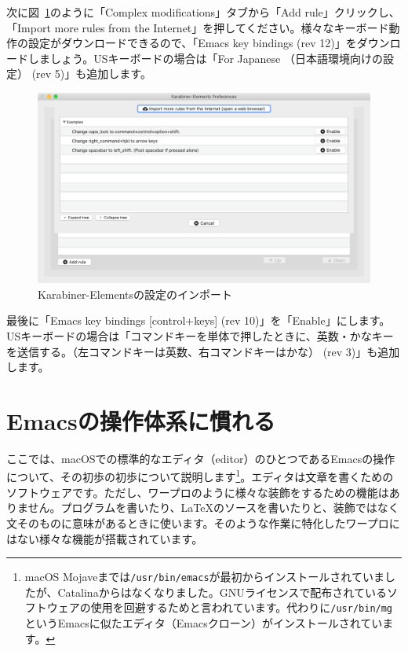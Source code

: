 次に図~\ref{fig:Karabiner_import}のように「Complex modifications」タブから「Add rule」クリックし、「Import more rules from the Internet」を押してください。様々なキーボード動作の設定がダウンロードできるので、「Emacs key bindings (rev 12)」をダウンロードしましょう。USキーボードの場合は「For Japanese （日本語環境向けの設定） (rev 5)」も追加します。

\begin{figure}
  \centering
  \includegraphics[scale=0.35]{fig/Karabiner_import.png}
  \caption{Karabiner-Elementsの設定のインポート}
  \label{fig:Karabiner_import}
\end{figure}

最後に「Emacs key bindings [control+keys] (rev 10)」を「Enable」にします。USキーボードの場合は「コマンドキーを単体で押したときに、英数・かなキーを送信する。（左コマンドキーは英数、右コマンドキーはかな） (rev 3)」も追加します。

\section{Emacsの操作体系に慣れる}
\label{sec:Emacs}

ここでは、macOSでの標準的なエディタ（editor）のひとつであるEmacsの操作について、その初歩の初歩について説明します\footnote{macOS Mojaveまでは\texttt{/usr/bin/emacs}が最初からインストールされていましたが、Catalinaからはなくなりました。GNUライセンスで配布されているソフトウェアの使用を回避するためと言われています。代わりに\texttt{/usr/bin/mg}というEmacsに似たエディタ（Emacsクローン）がインストールされています。}。エディタは文章を書くためのソフトウェアです。ただし、ワープロのように様々な装飾をするための機能はありません。プログラムを書いたり、\LaTeX{}のソースを書いたりと、装飾ではなく文そのものに意味があるときに使います。そのような作業に特化したワープロにはない様々な機能が搭載されています。

